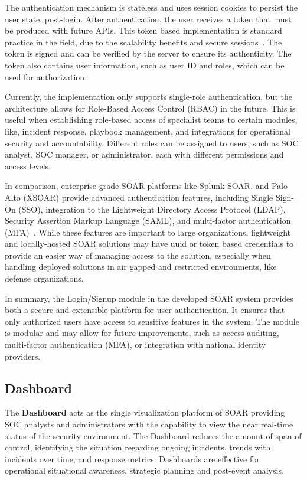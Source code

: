 The authentication mechanism is stateless and uses session cookies to persist the user state, post-login. After authentication, the user receives a token that must be produced with future APIs. This token based implementation is standard practice in the field, due to the scalability benefits and secure sessions~\cite{paloalto, techtarget}. The token is signed and can be verified by the server to ensure its authenticity. The token also contains user information, such as user ID and roles, which can be used for authorization.

Currently, the implementation only supports single-role authentication, but the architecture allows for Role-Based Access Control (RBAC) in the future. This is useful when establishing role-based access of specialist teams to certain modules, like, incident response, playbook management, and integrations for operational security and accountability. Different roles can be assigned to users, such as SOC analyst, SOC manager, or administrator, each with different permissions and access levels.

In comparison, enterprise-grade SOAR platforms like Splunk SOAR, and Palo Alto (XSOAR) provide advanced authentication features, including Single Sign-On (SSO), integration to the Lightweight Directory Access Protocol (LDAP), Security Assertion Markup Language (SAML), and multi-factor authentication (MFA)~\cite{splunk, paloalto}. While these features are important to large organizations, lightweight and locally-hosted SOAR solutions may have uuid or token based credentials to provide an easier way of managing access to the solution, especially when handling deployed solutions in air gapped and restricted environments, like defense organizations.

In summary, the Login/Signup module in the developed SOAR system provides both a secure and extensible platform for user authentication. It ensures that only authorized users have access to sensitive features in the system. The module is modular and may allow for future improvements, such as access auditing, multi-factor authentication (MFA), or integration with national identity providers.

\subsection{Dashboard}

The \textbf{Dashboard} acts as the single visualization platform of SOAR providing SOC analysts and administrators with the capability to view the near real-time status of the security  environment. The Dashboard reduces the amount of span of control, identifying the situation  regarding ongoing incidents, trends with incidents over time, and response metrics.  Dashboards are effective for operational situational awareness, strategic planning and post-event analysis.

